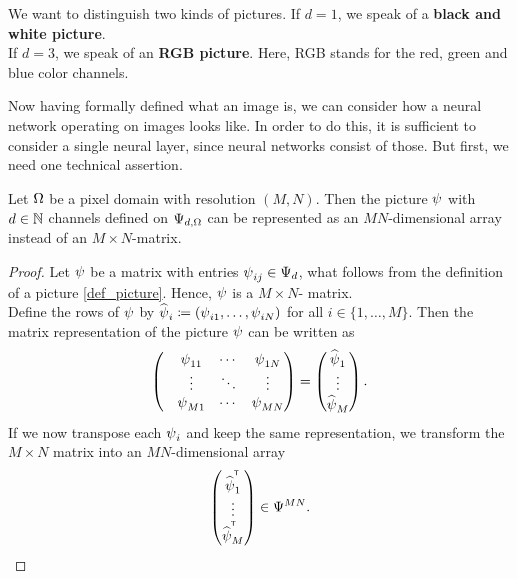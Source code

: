 \begin{remark}
We want to distinguish two kinds of pictures. If $d=1$, we speak of a \textbf{black and white picture}.\\
If $d=3$, we speak of an \textbf{RGB picture}. Here, RGB stands for the  red, green and blue color channels.
\end{remark}

Now having formally defined what an image is, we can consider how a neural network operating on images looks like. In order to do this, it is sufficient to consider  a single neural layer, since neural networks consist of those. But first, we need one technical assertion.

\begin{lemma}
Let $\Omega$ be a pixel domain with resolution $(M,N)$. Then the picture $\operatorname{\psi}$  with $d\in\operatorname{\mathbb{N}}$ channels defined on $\Psi_{d,\Omega}$ can be represented as an $MN$-dimensional array instead of an $M\times N$-matrix.
\end{lemma}

\begin{proof}
Let $\operatorname{\psi}$ be a matrix with entries $\operatorname{\psi}_{ij}\in\Psi_d$, what follows from the definition of a picture \ref{def_picture}. Hence, $\operatorname{\psi}$ is a $M\times N$- matrix.\\
Define the rows of $\operatorname{\psi}$ by $\widehat{\operatorname{\psi}}_i\coloneqq (\operatorname{\psi}_{i1},\ldots,\operatorname{\psi}_{iN})$ for all $i\in \{1,\ldots,M\}$. Then the matrix representation of the picture $\operatorname{\psi}$ can be written as
\begin{align*}
\begin{pmatrix}
&\operatorname{\psi}_{11} &\cdots &\operatorname{\psi}_{1N}\\
&\vdots  &\ddots		 &\vdots\\
&\operatorname{\psi}_{M1} &\cdots &\operatorname{\psi}_{MN}
\end{pmatrix}=
\begin{pmatrix}
\widehat{\operatorname{\psi}}_1\\
\vdots\\
\widehat{\operatorname{\psi}}_M
\end{pmatrix}.
\end{align*}
If we now transpose each $\operatorname{\psi}_i$ and keep the same representation, we transform the $M\times N$ matrix into an $MN$-dimensional array
\begin{align*}
 \begin{pmatrix}
\widehat{\operatorname{\psi}}^{^{\mkern-1.5mu\mathsf{T}}}_1\\
\vdots\\
\widehat{\operatorname{\psi}}^{^{\mkern-1.5mu\mathsf{T}}}_M
\end{pmatrix} \in \Psi^{MN}.
\end{align*}
\end{proof}

